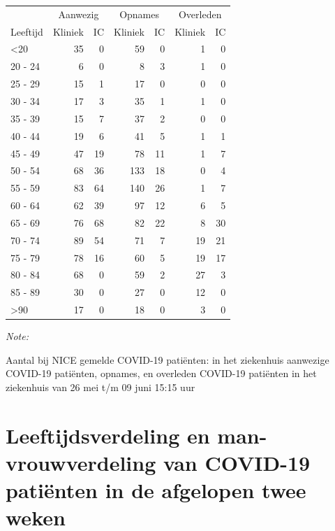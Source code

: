 \documentclass[
  english,
  man,floatsintext]{apa6}
\begin{document}
\begin{table}
\centering\begingroup\fontsize{10}{12}\selectfont

\begin{threeparttable}
\begin{tabular}{lrrrrrr}
\toprule
\multicolumn{1}{c}{ } & \multicolumn{2}{c}{Aanwezig} & \multicolumn{2}{c}{Opnames} & \multicolumn{2}{c}{Overleden} \\
\cmidrule(l{3pt}r{3pt}){2-3} \cmidrule(l{3pt}r{3pt}){4-5} \cmidrule(l{3pt}r{3pt}){6-7}
Leeftijd & Kliniek & IC & Kliniek & IC & Kliniek & IC\\
\midrule
<20 & 35 & 0 & 59 & 0 & 1 & 0\\
20 - 24 & 6 & 0 & 8 & 3 & 1 & 0\\
25 - 29 & 15 & 1 & 17 & 0 & 0 & 0\\
30 - 34 & 17 & 3 & 35 & 1 & 1 & 0\\
35 - 39 & 15 & 7 & 37 & 2 & 0 & 0\\
40 - 44 & 19 & 6 & 41 & 5 & 1 & 1\\
45 - 49 & 47 & 19 & 78 & 11 & 1 & 7\\
50 - 54 & 68 & 36 & 133 & 18 & 0 & 4\\
55 - 59 & 83 & 64 & 140 & 26 & 1 & 7\\
60 - 64 & 62 & 39 & 97 & 12 & 6 & 5\\
65 - 69 & 76 & 68 & 82 & 22 & 8 & 30\\
70 - 74 & 89 & 54 & 71 & 7 & 19 & 21\\
75 - 79 & 78 & 16 & 60 & 5 & 19 & 17\\
80 - 84 & 68 & 0 & 59 & 2 & 27 & 3\\
85 - 89 & 30 & 0 & 27 & 0 & 12 & 0\\
>90 & 17 & 0 & 18 & 0 & 3 & 0\\
\bottomrule
\end{tabular}
\begin{tablenotes}
\item \textit{Note: } 
\item Aantal bij NICE gemelde COVID-19 patiënten: in het ziekenhuis aanwezige COVID-19 patiënten, opnames, en overleden COVID-19 patiënten in het ziekenhuis van 26 mei t/m 09 juni 15:15 uur
\end{tablenotes}
\end{threeparttable}
\endgroup{}
\end{table}

\newpage

\hypertarget{leeftijdsverdeling-en-man-vrouwverdeling-van-covid-19-patiuxebnten-in-de-afgelopen-twee-weken}{%
\section{Leeftijdsverdeling en man-vrouwverdeling van COVID-19 patiënten in de afgelopen twee weken}\label{leeftijdsverdeling-en-man-vrouwverdeling-van-covid-19-patiuxebnten-in-de-afgelopen-twee-weken}}
\end{document}
